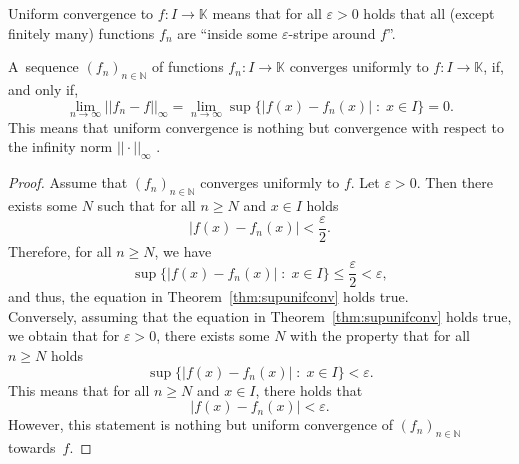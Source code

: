 \begin{Remark}{}
Uniform convergence to $f:I\to\mathbb{K}$ means that for all $\varepsilon>0$ holds that all (except finitely many) functions $f_n$ are ``inside some $\varepsilon$-stripe around $f$''.
\end{Remark}

\begin{Theorem}\label{thm:supunifconv}
A~sequence $(f_n)_{n\in\mathbb{N}}$ of functions $f_n:I\to\mathbb{K}$ converges uniformly to $f:I\to\mathbb{K}$, if, and only if,
\begin{equation}
\lim_{n\to\infty}||f_n-f||_\infty=\lim_{n\to\infty}\sup\{|f(x)-f_n(x)|\;:\;x\in I\}=0.
\end{equation}
This means that uniform convergence is nothing but convergence with respect to the infinity norm $||\cdot||_\infty$ .
\end{Theorem}



\begin{proof}
Assume that $(f_n)_{n\in\mathbb{N}}$ converges uniformly to $f$. Let $\varepsilon>0$. Then there exists some $N$ such that for all $n\geq N$ and $x\in I$ holds
\[|f(x)-f_n(x)|<\frac\varepsilon2.\]
Therefore, for all $n\geq N$, we have
\[\sup\{|f(x)-f_n(x)|\;:\;x\in I\}\leq\frac\varepsilon2<\varepsilon,\]
and thus, the equation in Theorem~\ref{thm:supunifconv} holds true.\\
Conversely, assuming that the equation in Theorem~\ref{thm:supunifconv} holds true, we obtain that for $\varepsilon>0$, there exists some $N$ with the property that for all $n\geq N$ holds
\[\sup\{|f(x)-f_n(x)|\;:\;x\in I\}<\varepsilon.\]
This means that for all $n\geq N$ and $x\in I$, there holds that
\[|f(x)-f_n(x)|<\varepsilon.\]
However, this statement is nothing but uniform convergence of $(f_n)_{n\in\mathbb{N}}$ towards~$f$.
\end{proof}


